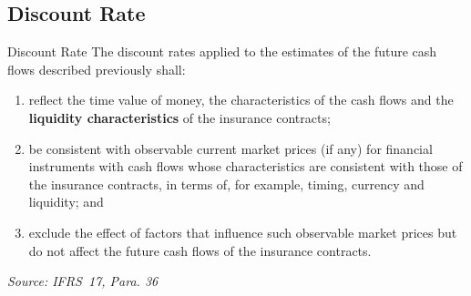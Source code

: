 \documentclass[aspectratio=169]{beamer}
\begin{document}
\subsection{Discount Rate}
\begin{frame}{Discount Rate}
The discount rates applied to the estimates of the future cash flows described previously shall: 
\begin{enumerate}
\item reflect the time value of money, the characteristics of the cash flows and the \textbf{liquidity characteristics} of the insurance contracts;
\item be consistent with observable current market prices (if any) for financial instruments with cash flows whose characteristics are consistent with those of the insurance contracts, in terms of, for example, timing, currency and liquidity; and
\item exclude the effect of factors that influence such observable market prices but do not affect the future cash flows of the insurance contracts.
\end{enumerate}
\footnotesize
\textit{Source: IFRS~17, Para. 36} \\
\normalsize
\end{frame}
\end{document}
